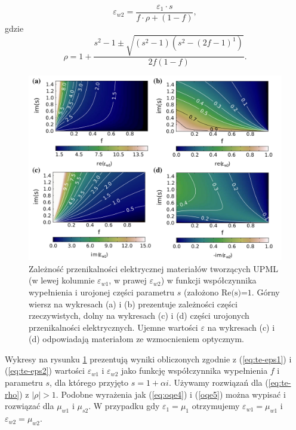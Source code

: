 \begin{equation}
	\varepsilon_{w2}=\frac{\varepsilon_1 \cdot s}{f\cdot \rho + (1-f)},
	\label{eq:te-eps2}
\end{equation}
gdzie
\begin{equation}
	\rho = 1+\frac{s^2-1 \pm \sqrt{(s^2-1)(s^2-(2f-1)^1)}}{2f(1-f)}.
	\label{eq:te-rho}
\end{equation}

\begin{figure}[tb]
	\includegraphics[width=\textwidth]{images/pml/oqe_materials.png}
	\caption{Zależność przenikalności elektrycznej materiałów tworzących UPML (w lewej kolumnie $\varepsilon_{w1}$, w prawej $\varepsilon_{w2}$) w funkcji współczynnika wypełnienia i urojonej części parametru $s$ (założono $\textrm{Re(s)=1}$. Górny wiersz na wykresach (a) i (b) prezentuje zależności części rzeczywistych, dolny na wykresach (c) i (d) części urojonych przenikalności elektrycznych. Ujemne wartości $\varepsilon$ na wykresach (c) i (d) odpowiadają materiałom ze wzmocnieniem optycznym. }
	\label{fig:upml-eps-s-f}
\end{figure}

Wykresy na rysunku \ref{fig:upml-eps-s-f} prezentują wyniki obliczonych zgodnie z (\ref{eq:te-eps1}) i (\ref{eq:te-eps2}) wartości $\varepsilon_{w1}$ i $\varepsilon_{w2}$ jako funkcję współczynnika wypełnienia $f$ i parametru $s$, dla którego przyjęto $s=1+\alpha i$. Używamy rozwiązań dla (\ref{eq:te-rho}) z $|\rho|>1$. Podobne wyrażenia jak (\ref{eq:oqe4}) i (\ref{oqe5}) można wypisać i rozwiązać dla $\mu_{w1}$ i $\mu_{s2}$. W przypadku gdy $\varepsilon_1=\mu_1$ otrzymujemy $\varepsilon_{w1}=\mu_{w1}$ i $\varepsilon_{w2}=\mu_{w2}$. 


